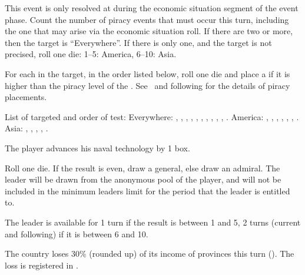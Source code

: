 
\phevnt
\aparag This event is only resolved at during the economic situation segment
of the event phase.
\aparag Count the number of piracy events that must occur this turn, including
the one that may arise via the economic situation roll.
\bparag If there are two or more, then the target is ``Everywhere''.
\bparag If there is only one, and the target is not precised, roll one die:
1--5: America, 6--10: Asia.

\aparag For each \STZ in the target, in the order listed below, roll one die
and place a \PIRATE\facemoins if it is higher than the piracy level of the
\STZ. See~ and following for the details of
piracy placements.

\aparag List of targeted \STZ and order of test:
\bparag Everywhere: \seazoneCaraibes, , \seazoneIndien,
\seazoneOman, \seazoneGuinee, \seazoneRecife, \seazonePerou, \seazoneFormose,
\seazonePatagonie, \seazoneTempetes, .
\bparag America: \seazoneCaraibes, , \seazoneGuinee,
\seazoneRecife, \seazonePatagonie, \seazoneTempetes, .
\bparag Asia: \seazoneIndien, \seazoneOman, \seazonePerou, \seazoneFormose,
.




The player advances his naval technology by 1 box.




Roll one die. If the result is even, draw a general, else draw an admiral. The
leader will be drawn from the anonymous pool of the player, and will not be
included in the minimum leaders limit for the period that the leader is
entitled to.

The leader is available for 1 turn if the result is between 1 and 5, 2 turns
(current and following) if it is between 6 and 10.




The country loses 30\% (rounded up) of its income of provinces this turn
(). The loss is registered in
.



